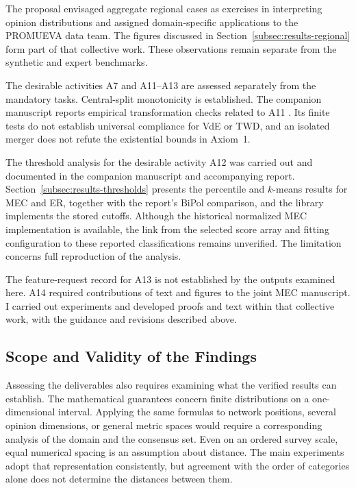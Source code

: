 \documentclass{article}
\theoremstyle{plain}
\theoremstyle{remark}
\begin{document}
The proposal envisaged aggregate regional cases as exercises in interpreting opinion distributions and assigned domain-specific applications to the PROMUEVA data team. The figures discussed in Section~\ref{subsec:results-regional} form part of that collective work. These observations remain separate from the synthetic and expert benchmarks.

The desirable activities A7 and A11--A13 are assessed separately from the mandatory tasks. Central-split monotonicity is established. The companion manuscript reports empirical transformation checks related to A11 \citep[Section~10]{arandaMECcompanion}. Its finite tests do not establish universal compliance for VdE or TWD, and an isolated merger does not refute the existential bounds in Axiom~1.

The threshold analysis for the desirable activity A12 was carried out and documented in the companion manuscript and accompanying report. Section~\ref{subsec:results-thresholds} presents the percentile and $k$-means results for MEC and ER, together with the report\textquoteright s BiPol comparison, and the library implements the stored cutoffs. Although the historical normalized MEC implementation is available, the link from the selected score array and fitting configuration to these reported classifications remains unverified. The limitation concerns full reproduction of the analysis.

The feature-request record for A13 is not established by the outputs examined here. A14 required contributions of text and figures to the joint MEC manuscript. I carried out experiments and developed proofs and text within that collective work, with the guidance and revisions described above.

\subsection{Scope and Validity of the Findings}\label{subsec:discussion-validity}

Assessing the deliverables also requires examining what the verified results can establish. The mathematical guarantees concern finite distributions on a one-dimensional interval. Applying the same formulas to network positions, several opinion dimensions, or general metric spaces would require a corresponding analysis of the domain and the consensus set. Even on an ordered survey scale, equal numerical spacing is an assumption about distance. The main experiments adopt that representation consistently, but agreement with the order of categories alone does not determine the distances between them.
\end{document}
